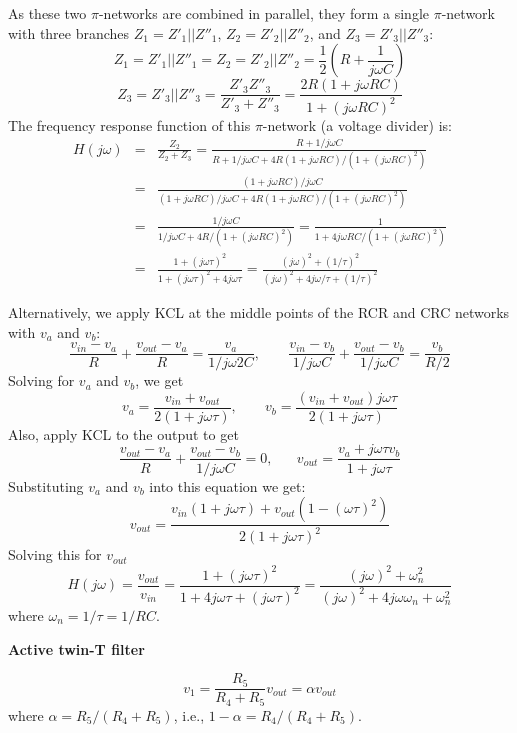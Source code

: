 As these two $\pi$-networks are combined in parallel, they form a single
$\pi$-network with three branches $Z_1=Z'_1||Z''_1$, $Z_2=Z'_2||Z''_2$, 
and $Z_3=Z'_3||Z''_3$:
\[
Z_1=Z'_1||Z''_1=Z_2=Z'_2||Z''_2=\frac{1}{2}\left(R+\frac{1}{j\omega C}\right)
\]
\[
  Z_3=Z'_3||Z''_3=\frac{Z'_3 Z''_3}{Z'_3+Z''_3}
  =\frac{2R(1+j\omega RC)}{1+(j\omega RC)^2}
\]
The frequency response function of this $\pi$-network (a voltage divider) is:
\begin{eqnarray}
  H(j\omega)&=&\frac{Z_2}{Z_2+Z_3}=\frac{R+1/j\omega C}
  {R+1/j\omega C+4R(1+j\omega RC)/(1+(j\omega RC)^2)}
  \nonumber \\
  &=&\frac{(1+j\omega RC)/j\omega C}{(1+j\omega RC)/j\omega C+4R(1+j\omega RC)/(1+(j\omega RC)^2)}
  \nonumber \\
  &=&\frac{1/j\omega C}{1/j\omega C+4R/(1+(j\omega RC)^2)}
  =\frac{1}{1+4j\omega RC/(1+(j\omega RC)^2)}
  \nonumber \\
  &=&\frac{1+(j\omega\tau)^2}{1+(j\omega\tau)^2+4j\omega\tau}
  =\frac{(j\omega)^2+(1/\tau)^2}{(j\omega)^2+4j\omega/\tau+(1/\tau)^2}
  \nonumber
\end{eqnarray}

Alternatively, we apply KCL at the middle points of the RCR and CRC 
networks with $v_a$ and $v_b$:
\[
\frac{v_{in}-v_a}{R}+\frac{v_{out}-v_a}{R}=\frac{v_a}{1/j\omega 2C},
\;\;\;\;\;\;\;
\frac{v_{in}-v_b}{1/j\omega C}+\frac{v_{out}-v_b}{1/j\omega C}=\frac{v_b}{R/2}
\]
Solving for $v_a$ and $v_b$, we get
\[
v_a=\frac{v_{in}+v_{out}}{2(1+j\omega\tau)},\;\;\;\;\;\;\;
v_b=\frac{(v_{in}+v_{out})j\omega\tau}{2(1+j\omega\tau)}
\]
Also, apply KCL to the output to get
\[
\frac{v_{out}-v_a}{R}+\frac{v_{out}-v_b}{1/j\omega C}=0,\;\;\;\;\;\;
v_{out}=\frac{v_a+j\omega\tau v_b}{1+j\omega\tau}
\]
Substituting $v_a$ and $v_b$ into this equation we get:
\[
v_{out}=\frac{v_{in}(1+j\omega\tau)+v_{out}(1-(\omega\tau)^2)}{2(1+j\omega\tau)^2}
\]
Solving this for $v_{out}$
\[
H(j\omega)=\frac{v_{out}}{v_{in}}=\frac{1+(j\omega\tau)^2}{1+4j\omega\tau+(j\omega\tau)^2}
=\frac{(j\omega)^2+\omega_n^2}{(j\omega)^2+4j\omega\omega_n+\omega_n^2}
\]
where $\omega_n=1/\tau=1/RC$.


{\bf Active twin-T filter}

\[
v_1=\frac{R_5}{R_4+R_5}v_{out}=\alpha v_{out}
\]
where $\alpha=R_5/(R_4+R_5)$, i.e., $1-\alpha=R_4/(R_4+R_5)$.

